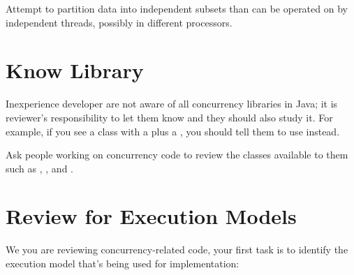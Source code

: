 \begin{marker}
Attempt to partition data into independent subsets than can be operated on by independent threads, possibly in different processors.
\end{marker}

\section{Know Library}

Inexperience developer are not aware of all concurrency libraries in Java; it is reviewer's responsibility to let them know and they should also study it. For example, if you see a class with a  plus a , you should tell them to use  instead.

\begin{marker}
Ask people working on concurrency code to review the classes available to them such as , , and .
\end{marker}

\section{Review for Execution Models}

We you are reviewing concurrency-related code, your first task is to identify the execution model that's being used for implementation:

